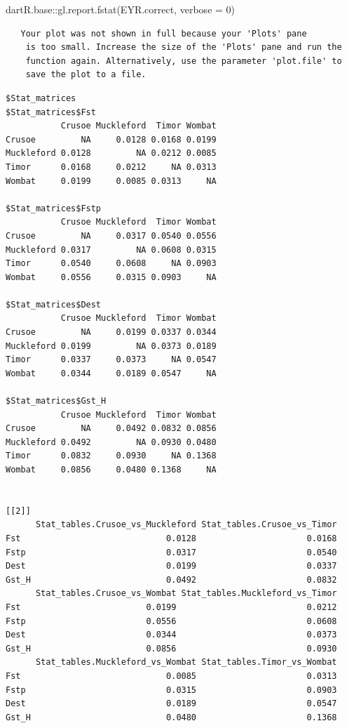 \documentclass[
  letterpaper,
  DIV=11,
  numbers=noendperiod]{scrreprt}
\newenvironment{Shaded}{\begin{snugshade}}{\end{snugshade}}
\newcommand{\AttributeTok}[1]{\textcolor[rgb]{0.49,0.56,0.16}{#1}}
\newcommand{\DecValTok}[1]{\textcolor[rgb]{0.25,0.63,0.44}{#1}}
\newcommand{\FunctionTok}[1]{\textcolor[rgb]{0.02,0.16,0.49}{#1}}
\newcommand{\NormalTok}[1]{\textcolor[rgb]{0.00,0.44,0.13}{#1}}
\newcommand{\SpecialCharTok}[1]{\textcolor[rgb]{0.25,0.44,0.63}{#1}}
\begin{document}
\begin{Shaded}
\begin{Highlighting}[]
\NormalTok{dartR.base}\SpecialCharTok{::}\FunctionTok{gl.report.fstat}\NormalTok{(EYR.correct, }\AttributeTok{verbose =} \DecValTok{0}\NormalTok{)}
\end{Highlighting}
\end{Shaded}

\begin{verbatim}
   Your plot was not shown in full because your 'Plots' pane
    is too small. Increase the size of the 'Plots' pane and run the
    function again. Alternatively, use the parameter 'plot.file' to
    save the plot to a file.
\end{verbatim}

\begin{verbatim}
$Stat_matrices
$Stat_matrices$Fst
           Crusoe Muckleford  Timor Wombat
Crusoe         NA     0.0128 0.0168 0.0199
Muckleford 0.0128         NA 0.0212 0.0085
Timor      0.0168     0.0212     NA 0.0313
Wombat     0.0199     0.0085 0.0313     NA

$Stat_matrices$Fstp
           Crusoe Muckleford  Timor Wombat
Crusoe         NA     0.0317 0.0540 0.0556
Muckleford 0.0317         NA 0.0608 0.0315
Timor      0.0540     0.0608     NA 0.0903
Wombat     0.0556     0.0315 0.0903     NA

$Stat_matrices$Dest
           Crusoe Muckleford  Timor Wombat
Crusoe         NA     0.0199 0.0337 0.0344
Muckleford 0.0199         NA 0.0373 0.0189
Timor      0.0337     0.0373     NA 0.0547
Wombat     0.0344     0.0189 0.0547     NA

$Stat_matrices$Gst_H
           Crusoe Muckleford  Timor Wombat
Crusoe         NA     0.0492 0.0832 0.0856
Muckleford 0.0492         NA 0.0930 0.0480
Timor      0.0832     0.0930     NA 0.1368
Wombat     0.0856     0.0480 0.1368     NA


[[2]]
      Stat_tables.Crusoe_vs_Muckleford Stat_tables.Crusoe_vs_Timor
Fst                             0.0128                      0.0168
Fstp                            0.0317                      0.0540
Dest                            0.0199                      0.0337
Gst_H                           0.0492                      0.0832
      Stat_tables.Crusoe_vs_Wombat Stat_tables.Muckleford_vs_Timor
Fst                         0.0199                          0.0212
Fstp                        0.0556                          0.0608
Dest                        0.0344                          0.0373
Gst_H                       0.0856                          0.0930
      Stat_tables.Muckleford_vs_Wombat Stat_tables.Timor_vs_Wombat
Fst                             0.0085                      0.0313
Fstp                            0.0315                      0.0903
Dest                            0.0189                      0.0547
Gst_H                           0.0480                      0.1368
\end{verbatim}
\end{document}

